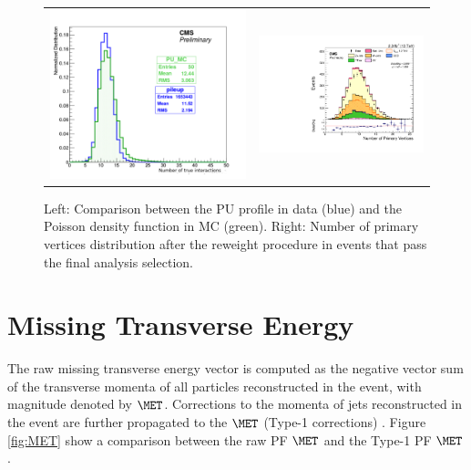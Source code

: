 \begin{figure}[!ht]
\caption{Left: Comparison between the PU profile in data (blue) and the Poisson density function in MC (green). Right: Number of primary vertices distribution after the reweight procedure in events that pass the final analysis selection.}
\begin{tabular}{cc}
\includegraphics[width=250pt]{figures/Objects/PV.pdf}&
\includegraphics[width=210pt]{figuresARC/CONTROLPLOTS/can_h_nVtx.pdf}\\
\end{tabular}
\label{fig:nv}
\end{figure}

\section{Missing Transverse Energy}\label{met}

The raw missing transverse energy vector is computed as the negative vector sum of the transverse momenta of all particles reconstructed in the event, with magnitude denoted by $\MET$. Corrections to the momenta of jets reconstructed in the event are further propagated to the $\MET$ (Type-1 corrections) \cite{CMS:2016ljj}. Figure \ref{fig:MET} show a comparison between the raw PF $\MET$ and the Type-1 PF $\MET$.

